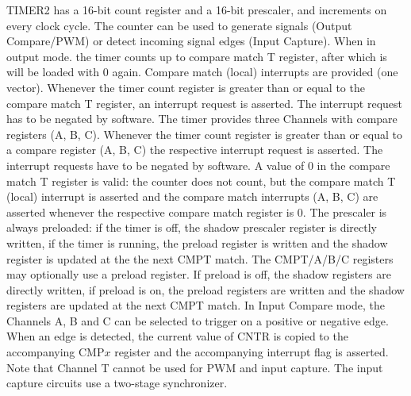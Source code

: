 \documentclass[12pt]{article}
\begin{document}
TIMER2 has a 16-bit count register and a 16-bit prescaler, and increments on every clock cycle. The counter can be used to generate signals (Output Compare/PWM) or detect incoming signal edges (Input Capture). When in output mode. the timer counts up to compare match T register, after which is will be loaded with 0 again. Compare match (local) interrupts are provided (one vector). Whenever the timer count register is greater than or equal to the compare match T register, an interrupt request is asserted. The interrupt request has to be negated by software. The timer provides three Channels with compare registers (A, B, C). Whenever the timer count register is greater than or equal to a compare register (A, B, C) the respective interrupt request is asserted. The interrupt requests have to be negated by software. A value of 0 in the compare match T register is valid: the counter does not count, but the compare match T (local) interrupt is asserted and the compare match interrupts (A, B, C) are asserted whenever the respective compare match register is 0. The prescaler is always preloaded: if the timer is off, the shadow prescaler register is directly written, if the timer is running, the preload register is written and the shadow register is updated at the the next CMPT match. The CMPT/A/B/C registers may optionally use a preload register. If preload is off, the shadow registers are directly written, if preload is on, the preload registers are written and the shadow registers are updated at the next CMPT match. In Input Compare mode, the Channels A, B and C can be selected to trigger on a positive or negative edge. When an edge is detected, the current value of CNTR is copied to the accompanying CMP$x$ register and the accompanying interrupt flag is asserted. Note that Channel T cannot be used for PWM and input capture. The input capture circuits use a two-stage synchronizer. 
\end{document}
